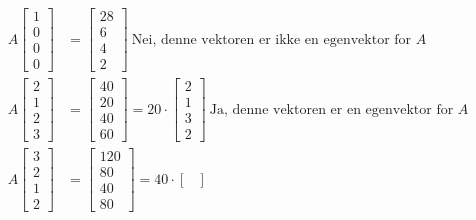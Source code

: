 \documentclass[11pt, a4paper, norsk]{NTNUoving}
\begin{document}
\begin{oppgave}
\begin{punkt}
\begin{align*}
            A\begin{bmatrix}
                1 \\
                0 \\
                0 \\
                0
            \end{bmatrix} &= \begin{bmatrix}
                28 \\
                6 \\
                4 \\
                2
        \end{bmatrix} \: \text{Nei, denne vektoren er ikke en egenvektor for } A
        \\
            A\begin{bmatrix}
                2 \\
                1 \\
                2 \\
                3
            \end{bmatrix} &= \begin{bmatrix}
                40 \\
                20 \\
                40 \\
                60
            \end{bmatrix} = 20 \cdot \begin{bmatrix}
                2 \\
                1 \\
                3 \\
                2
        \end{bmatrix} \: \text{Ja, denne vektoren er en egenvektor for } A
        \\
            A\begin{bmatrix}
                3 \\
                2 \\
                1 \\
                2
            \end{bmatrix} &= \begin{bmatrix}
                120 \\
                80 \\
                40 \\
                80
            \end{bmatrix} = 40 \cdot \begin{bmatrix}

\end{bmatrix}
\end{align*}
\end{punkt}
\end{oppgave}
\end{document}
